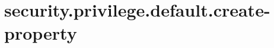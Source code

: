 \section{security.privilege.default.create-property}
\label{configuration:SecurityPrivilegeDefaultCreateProperty}
\AvailableInJavaOnly{\TODO}